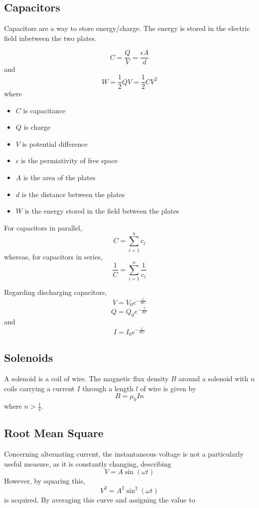 \documentclass{article}
\begin{document}
\subsection{Capacitors}


Capacitors are a way to store energy/charge. The energy is stored in the
electric field inbetween the two plates.

\[C=\frac{Q}{V}=\frac{\epsilon A}{d}\] and \[W=\frac{1}{2}QV=\frac{1}{2}CV^2\]
where \begin{itemize}
	\item $C$ is capacitance
	\item $Q$ is charge
	\item $V$ is potential difference
	\item $\epsilon$ is the permiativity of free space
	\item $A$ is the area of the plates
	\item $d$ is the distance between the plates
	\item $W$ is the energy stored in the field between the plates
\end{itemize}

For capacitors in parallel, \[C=\sum_{i=1}^nc_i\] whereas, for capacitors in
series, \[\frac{1}{C}=\sum_{i=1}^n\frac{1}{c_i}\]

Regarding discharging capacitors, \[V=V_0e^{-\frac{t}{RC}}\]
\[Q=Q_0e^{-\frac{t}{RC}}\] and \[I=I_0e^{-\frac{t}{RC}}\]

\subsection{Solenoids}

A solenoid is a coil of wire. The magnetic flux density $B$ around a solenoid
with $n$ coils carrying a current $I$ through a length $l$ of wire is given by
\[B=\mu_0In\] where $n>\frac{1}{\pi}$.

\subsection{Root Mean Square}

Concerning alternating current, the instantaneous voltage is not a particularly
useful measure, as it is constantly changing, describing \[V = A \sin
\left(\omega t\right)\] However, by squaring this, \[V^2 = A^2 \sin^2
\left(\omega t\right)\] is acquired. By averaging this curve and assigning the
value to 
\end{document}
